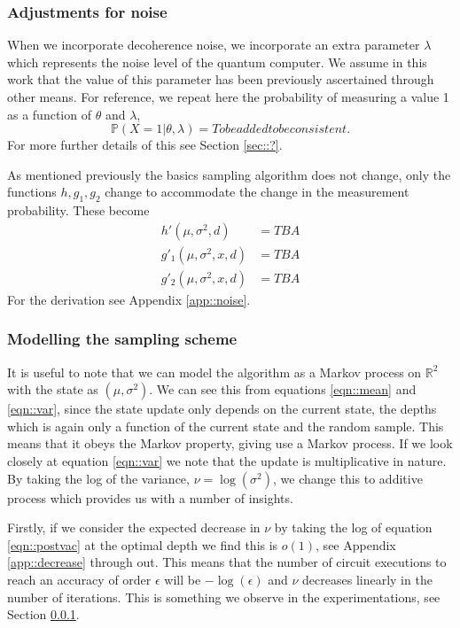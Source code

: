 \subsubsection{Adjustments for noise}
When we incorporate decoherence noise, we incorporate an extra parameter $\lambda$ which represents the noise level of the quantum computer. We assume in this work that the value of this parameter has been previously ascertained through other means. For reference, we repeat here the probability of measuring a value 1 as a function of $\theta$ and $\lambda$,
$$\mathbb{P}(X=1| \theta, \lambda)=To be added to be consistent.$$
For more further details of this see Section \ref{sec::?}.

As mentioned previously the basics sampling algorithm does not change, only the functions $h, g_1, g_2$ change to accommodate the change in the measurement probability. These become
\begin{align}
	h'(\mu,\sigma^2,d) &= TBA \label{eqn::npostvac}\\
	g'_1(\mu,\sigma^2,x,d) &= TBA \label{eqn::nmean}\\
	g'_2(\mu,\sigma^2,x,d) &= TBA \label{eqn::nvar}
\end{align}
For the derivation see Appendix \ref{app::noise}.


\subsubsection{Modelling the sampling scheme}\label{sec::model}

It is useful to note that we can model the algorithm as a Markov process on $\mathbb{R}^2$ with the state as $(\mu,\sigma^2)$. We can see this from equations \ref{eqn::mean} and \ref{eqn::var}, since the state update only depends on the current state, the depths which is again only a function of the current state and the random sample. This means that it obeys the Markov property, giving use a Markov process. If we look closely at equation \ref{eqn::var} we note that the update is multiplicative in nature. By taking the log of the variance, $\nu=\log(\sigma^2)$, we change this to additive process which provides us with a number of insights.

Firstly, if we consider the expected decrease in $\nu$ by taking the log of equation \ref{eqn::postvac} at the optimal depth we find this is $o(1)$, see Appendix \ref{app::decrease} through out. This means that the number of circuit executions to reach an accuracy of order $\epsilon$ will be $-\log(\epsilon)$ and $\nu$ decreases linearly in the number of iterations. This is something we observe in the experimentations, see Section \ref{}.

